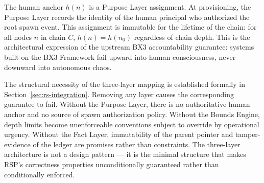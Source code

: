 The human anchor $h(n)$ is a Purpose Layer assignment. At provisioning, the Purpose Layer records the identity of the human principal who authorized the root spawn event. This assignment is immutable for the lifetime of the chain: for all nodes $n$ in chain $C$, $h(n) = h(n_0)$ regardless of chain depth. This is the architectural expression of the upstream BX3 accountability guarantee: systems built on the BX3 Framework fail upward into human consciousness, never downward into autonomous chaos.

The structural necessity of the three-layer mapping is established formally in Section~\ref{sec:rs-integration}. Removing any layer causes the corresponding guarantee to fail. Without the Purpose Layer, there is no authoritative human anchor and no source of spawn authorization policy. Without the Bounds Engine, depth limits become unenforceable conventions subject to override by operational urgency. Without the Fact Layer, immutability of the parent pointer and tamper-evidence of the ledger are promises rather than constraints. The three-layer architecture is not a design pattern --- it is the minimal structure that makes RSP's correctness properties unconditionally guaranteed rather than conditionally enforced.
